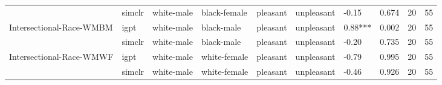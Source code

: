 \begin{tabular}{llllllllll}
                         & simclr &  white-male &  black-female &    pleasant &    unpleasant &    -0.15 &  0.674 &    20 &    55 \\
Intersectional-Race-WMBM & igpt &  white-male &    black-male &    pleasant &    unpleasant &  0.88*** &  0.002 &    20 &    55 \\
                         & simclr &  white-male &    black-male &    pleasant &    unpleasant &    -0.20 &  0.735 &    20 &    55 \\
Intersectional-Race-WMWF & igpt &  white-male &  white-female &    pleasant &    unpleasant &    -0.79 &  0.995 &    20 &    55 \\
                         & simclr &  white-male &  white-female &    pleasant &    unpleasant &    -0.46 &  0.926 &    20 &    55 \\
\bottomrule
\end{tabular}
